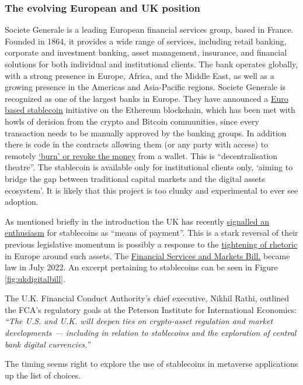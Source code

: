 \begin{itemize}
\subsubsection{The evolving European and UK position}
Societe Generale is a leading European financial services group, based in France. Founded in 1864, it provides a wide range of services, including retail banking, corporate and investment banking, asset management, insurance, and financial solutions for both individual and institutional clients. The bank operates globally, with a strong presence in Europe, Africa, and the Middle East, as well as a growing presence in the Americas and Asia-Pacific regions. Societe Generale is recognized as one of the largest banks in Europe. They have announced a \href{https://www.sgforge.com/societe-generale-forge-launches-coinvertible-the-first-institutional-stablecoin-deployed-on-a-public-blockchain/}{Euro based stablecoin} initiative on the Ethereum blockchain, which has been met with howls of derision from the crypto and Bitcoin communities, since every transaction needs to be manually approved by the banking groups. In addition there is code in the contracts allowing them (or any party with access) to remotely \href{https://etherscan.io/address/0xf7790914dc335b20aa19d7c9c9171e14e278a134#code}{`burn' or revoke the money} from a wallet. This is ``decentralisation theatre''. The stablecoin is available only for institutional clients only, `aiming to bridge the gap between traditional capital markets and the digital assets ecosystem'. It is likely that this project is too clunky and experimental to ever see adoption.\par 
As mentioned briefly in the introduction the UK has recently \href{https://www.gov.uk/government/news/government-sets-out-plan-to-make-uk-a-global-cryptoasset-technology-hub}{signalled an enthusiasm} for stablecoins as ``means of payment''. This is a stark reversal of their previous legislative momentum is possibly a response to the \href{https://www.coindesk.com/policy/2022/05/11/eu-commission-favors-ban-on-large-scale-stablecoins-document-shows/}{tightening of rhetoric} in Europe around such assets. The \href{https://publications.parliament.uk/pa/bills/cbill/58-03/0146/220146.pdf}{Financial Services and Markets Bill.} became law in July 2022. An excerpt pertaining to stablecoins can be seen in Figure \ref{fig:ukdigitalbill}. \par
The U.K. Financial Conduct Authority’s chief executive, Nikhil Rathi, outlined the FCA’s regulatory goals at the Peterson Institute for International Economics: \textit{``The U.S. and U.K. will deepen ties on crypto-asset regulation and market developments — including in relation to stablecoins and the exploration of central bank digital currencies.''} \par
The timing seems right to explore the use of stablecoins in metaverse applications up the list of choices. 


\end{itemize}
